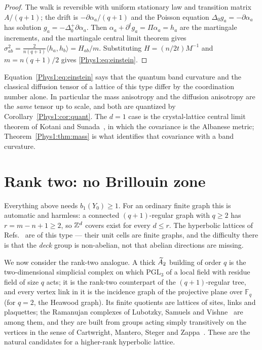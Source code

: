 \begin{proof}
The walk is reversible with uniform stationary law and transition matrix $A/(q{+}1)$; the
drift is $-\partial\alpha_a/(q{+}1)$ and the Poisson equation $\Delta_0g_a=-\partial\alpha_a$
has solution $g_a=-\Delta_0^{+}\partial\alpha_a$. Then
$\alpha_a+\partial^{t}g_a=\Pi\alpha_a=h_a$ are the martingale increments, and the
martingale central limit theorem gives
$\sigma^{2}_{ab}=\frac{2}{n(q+1)}\langle h_a,h_b\rangle=H_{ab}/m$. Substituting
$H=(n/2t)M^{-1}$ and $m=n(q{+}1)/2$ gives \eqref{Phys1:eq:einstein}.
\end{proof}

Equation~\eqref{Phys1:eq:einstein} says that the quantum band curvature and the classical
diffusion tensor of a lattice of this type differ by the coordination number alone. In
particular the mass anisotropy and the diffusion anisotropy are the \emph{same} tensor up
to scale, and both are quantized by Corollary~\ref{Phys1:cor:quant}. The $d=1$ case is the
crystal-lattice central limit theorem of Kotani and Sunada~\cite{KS1}, in which the
covariance is the Albanese metric; Theorem~\ref{Phys1:thm:mass} is what identifies that covariance
with a band curvature.

\section{Rank two: no Brillouin zone}\label{Phys1:sec:nogo}

Everything above needs $b_1(Y_0)\ge1$. For an ordinary finite graph this is automatic and
harmless: a connected $(q{+}1)$-regular graph with $q\ge2$ has $r=m-n+1\ge2$, so $\mathbb{Z}^{d}$
covers exist for every $d\le r$. The hyperbolic lattices of Refs.~ are
of this type --- their unit cells are finite graphs, and the difficulty there is that the
\emph{deck} group is non-abelian, not that abelian directions are missing.

We now consider the rank-two analogue. A thick $\widetilde A_2$ building of order $q$ is the
two-dimensional simplicial complex on which $\mathrm{PGL}_3$ of a local field with residue
field of size $q$ acts; it is the rank-two counterpart of the $(q{+}1)$-regular tree, and
every vertex link in it is the incidence graph of the projective plane over $\mathbb F_q$
(for $q=2$, the Heawood graph). Its finite quotients are lattices of sites, links and
plaquettes; the Ramanujan complexes of Lubotzky, Samuels and Vishne~\cite{LSV} are among
them, and they are built from groups acting simply transitively on the vertices in the sense
of Cartwright, Mantero, Steger and Zappa~\cite{CMSZ}. These are the natural candidates for a
higher-rank hyperbolic lattice.

